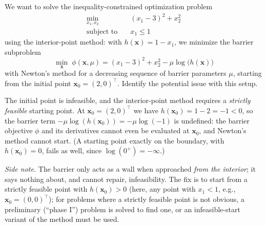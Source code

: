 \begin{exercise} %
    
    We want to solve the inequality-constrained optimization problem
    \[
    \begin{aligned}
        \min_{x_1, x_2} \quad & (x_1 - 3)^2 + x_2^2 \\
        \text{subject to} \quad & x_1 \le 1
    \end{aligned}
    \]
    using the interior-point method: with $h(\mathbf{x}) = 1 - x_1$, we minimize the barrier subproblem
    \[
        \min_{\mathbf{x}} \; \phi(\mathbf{x}, \mu) = (x_1 - 3)^2 + x_2^2 - \mu \log\big(h(\mathbf{x})\big)
    \]
    with Newton's method for a decreasing sequence of barrier parameters $\mu$, starting from the initial point $\mathbf{x}_0 = (2, 0)^\top$. Identify the potential issue with this setup.
    
\end{exercise}

\begin{solution}
    
    The initial point is infeasible, and the interior-point method requires a \emph{strictly feasible} starting point. At $\mathbf{x}_0 = (2, 0)^\top$ we have $h(\mathbf{x}_0) = 1 - 2 = -1 < 0$, so the barrier term $-\mu \log(h(\mathbf{x}_0)) = -\mu \log(-1)$ is undefined: the barrier objective $\phi$ and its derivatives cannot even be evaluated at $\mathbf{x}_0$, and Newton's method cannot start. (A starting point exactly on the boundary, with $h(\mathbf{x}_0) = 0$, fails as well, since $\log(0^+) = -\infty$.)

    \emph{Side note.} The barrier only acts as a wall when approached \emph{from the interior}; it says nothing about, and cannot repair, infeasibility. The fix is to start from a strictly feasible point with $h(\mathbf{x}_0) > 0$ (here, any point with $x_1 < 1$, e.g., $\mathbf{x}_0 = (0,0)^\top$); for problems where a strictly feasible point is not obvious, a preliminary (``phase I'') problem is solved to find one, or an infeasible-start variant of the method must be used.
    
\end{solution}

